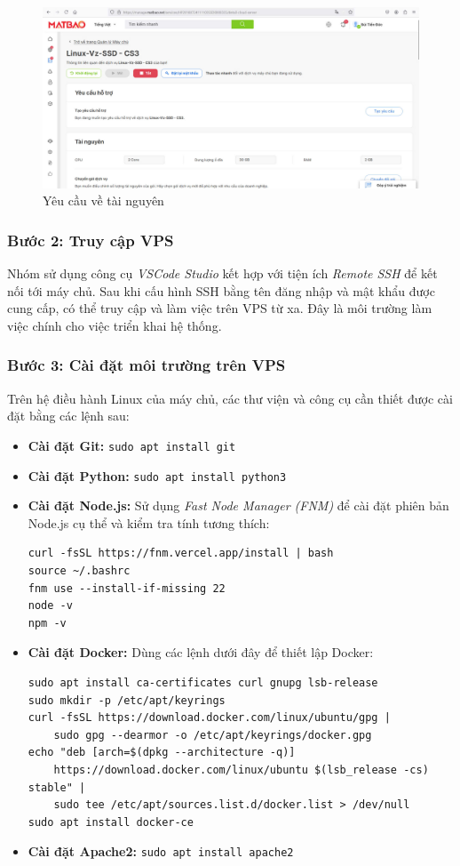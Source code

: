 \begin{figure}[H]
    \centering
    \includegraphics[width=0.8\linewidth]{images/vps3.jpg}
    \vspace{0.5cm} 
    \caption{Yêu cầu về tài nguyên}    
\end{figure}


\subsubsection{Bước 2: Truy cập VPS}
Nhóm sử dụng công cụ \textit{VSCode Studio} kết hợp với tiện ích \textit{Remote SSH} để kết nối tới máy chủ. Sau khi cấu hình SSH bằng tên đăng nhập và mật khẩu được cung cấp, có thể truy cập và làm việc trên VPS từ xa. Đây là môi trường làm việc chính cho việc triển khai hệ thống.

\subsubsection{Bước 3: Cài đặt môi trường trên VPS}
Trên hệ điều hành Linux của máy chủ, các thư viện và công cụ cần thiết được cài đặt bằng các lệnh sau:
\begin{itemize}
    \item \textbf{Cài đặt Git:} \texttt{sudo apt install git}
    \item \textbf{Cài đặt Python:} \texttt{sudo apt install python3}
    \item \textbf{Cài đặt Node.js:} Sử dụng \textit{Fast Node Manager (FNM)} để cài đặt phiên bản Node.js cụ thể và kiểm tra tính tương thích:
    \begin{verbatim}
curl -fsSL https://fnm.vercel.app/install | bash
source ~/.bashrc
fnm use --install-if-missing 22
node -v
npm -v
    \end{verbatim}
    \item \textbf{Cài đặt Docker:} Dùng các lệnh dưới đây để thiết lập Docker:
    \begin{verbatim}
sudo apt install ca-certificates curl gnupg lsb-release
sudo mkdir -p /etc/apt/keyrings
curl -fsSL https://download.docker.com/linux/ubuntu/gpg | 
    sudo gpg --dearmor -o /etc/apt/keyrings/docker.gpg
echo "deb [arch=$(dpkg --architecture -q)] 
    https://download.docker.com/linux/ubuntu $(lsb_release -cs) stable" | 
    sudo tee /etc/apt/sources.list.d/docker.list > /dev/null
sudo apt install docker-ce
    \end{verbatim}
    \item \textbf{Cài đặt Apache2:} \texttt{sudo apt install apache2}
\end{itemize}

